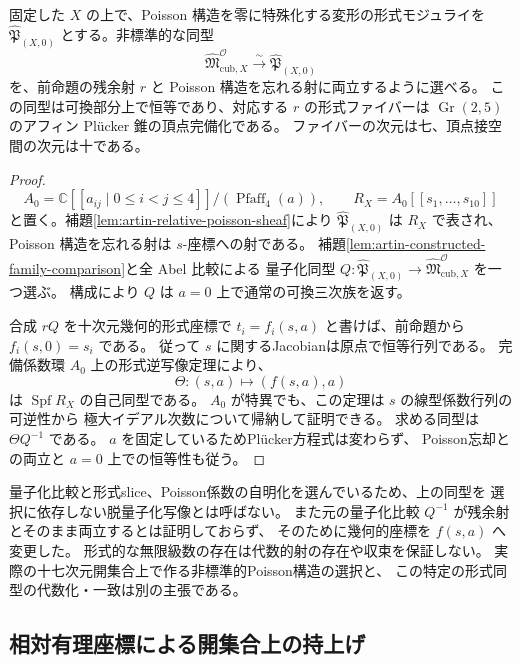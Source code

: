 \begin{corollary}[残余射に両立するPoisson形式近傍への同型]
\label{cor:abel-poisson-formal-lift}
固定した $X$ の上で、Poisson 構造を零に特殊化する変形の形式モジュライを
$\widehat{\mathfrak P}_{(X,0)}$ とする。非標準的な同型
\[
 \widehat{\mathfrak M}^{\mathcal O}_{\mathrm{cub},X}
 \xrightarrow{\ \sim\ }
 \widehat{\mathfrak P}_{(X,0)}
\]
を、前命題の残余射 $r$ と Poisson 構造を忘れる射に両立するように選べる。
この同型は可換部分上で恒等であり、対応する $r$ の形式ファイバーは
$\operatorname{Gr}(2,5)$ のアフィン Pl\"ucker 錐の頂点完備化である。
ファイバーの次元は七、頂点接空間の次元は十である。
\end{corollary}
\begin{proof}
\[
 A_0=\mathbb C[[a_{ij}\mid0\le i<j\le4]]/
       (\operatorname{Pfaff}_4(a)),\qquad
 R_X=A_0[[s_1,\ldots,s_{10}]]
\]
と置く。補題\ref{lem:artin-relative-poisson-sheaf}により
$\widehat{\mathfrak P}_{(X,0)}$ は $R_X$ で表され、
Poisson 構造を忘れる射は $s$-座標への射である。
補題\ref{lem:artin-constructed-family-comparison}と全 Abel 比較による
量子化同型 $Q:\widehat{\mathfrak P}_{(X,0)}\to
\widehat{\mathfrak M}^{\mathcal O}_{\mathrm{cub},X}$ を一つ選ぶ。
構成により $Q$ は $a=0$ 上で通常の可換三次族を返す。

合成 $rQ$ を十次元幾何的形式座標で
$t_i=f_i(s,a)$ と書けば、前命題から $f_i(s,0)=s_i$ である。
従って $s$ に関するJacobianは原点で恒等行列である。
完備係数環 $A_0$ 上の形式逆写像定理により、
\[
 \Theta:(s,a)\longmapsto(f(s,a),a)
\]
は $\operatorname{Spf}R_X$ の自己同型である。
$A_0$ が特異でも、この定理は $s$ の線型係数行列の可逆性から
極大イデアル次数について帰納して証明できる。
求める同型は $\Theta Q^{-1}$ である。
$a$ を固定しているためPl\"ucker方程式は変わらず、
Poisson忘却との両立と $a=0$ 上での恒等性も従う。
\end{proof}

\begin{remark}[形式的同型の範囲]
量子化比較と形式slice、Poisson係数の自明化を選んでいるため、上の同型を
選択に依存しない脱量子化写像とは呼ばない。
また元の量子化比較 $Q^{-1}$ が残余射とそのまま両立するとは証明しておらず、
そのために幾何的座標を $f(s,a)$ へ変更した。
形式的な無限級数の存在は代数的射の存在や収束を保証しない。
実際の十七次元開集合上で作る非標準的Poisson構造の選択と、
この特定の形式同型の代数化・一致は別の主張である。
\end{remark}

\subsection{相対有理座標による開集合上の持上げ}

